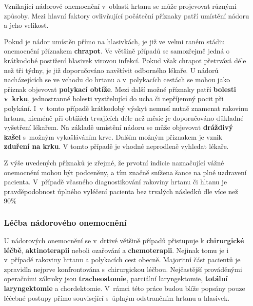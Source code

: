 Vznikající nádorové onemocnění v~oblasti hrtanu se může projevovat různými
způsoby. Mezi hlavní faktory ovlivňující počáteční příznaky patří umístění nádoru a
jeho velikost.

Pokud je nádor umístěn přímo na hlasivkách, je již ve velmi raném stádiu onemocnění příznakem \textbf{chrapot}.
Ve většině případů se samozřejmě jedná o krátkodobé postižení hlasivek virovou infekcí. Pokud však chrapot přetrvává déle než tři týdny, je již doporučováno navštívit odborného lékaře.
U nádorů nacházejících se ve vchodu do hrtanu a v~polykacích cestách se mohou
jako příznak objevovat \textbf{polykací obtíže}. Mezi další možné příznaky
patří \textbf{bolesti v~krku}, jednostranné bolesti vystřelující do ucha či
nepříjemný pocit při polykání. I~v~tomto případě krátkodobý výskyt nemusí
nutně znamenat rakovinu hrtanu, nicméně při obtížích trvajících déle než měsíc
je doporučováno důkladné  vyšetření lékařem.
Na základě umístění nádoru se může objevovat \textbf{dráždivý kašel} s~možným
vykašláváním krve. Dalším možným příznakem je vznik \textbf{zduření na krku}.
V tomto případě je vhodné neprodleně vyhledat lékaře.

Z výše uvedených příznaků je zřejmé, že prvotní indicie naznačující vážné onemocnění
mohou být podceněny, a tím značně snížena šance na plné uzdravení pacienta.
V~případě včasného diagnostikování rakoviny hrtanu či hltanu je pravděpodobnost
úplného vyléčení pacienta bez trvalých následků dle \cite{Slavicek2000} více než 90\%



\subsubsection{Léčba nádorového onemocnění} %
\label{chap:cause:desease:cancer:treatment}

U nádorových onemocnění se v~drtivé většině případů přistupuje k
\textbf{chirurgické léčbě}, \textbf{aktinoterapii} neboli ozařování a
\textbf{chemoterapii}. Nejinak tomu je i v~případě rakoviny hrtanu a
polykacích cest obecně. Majoritní část pacientů je zpravidla nejprve
konfrontována s~chirurgickou léčbou. Nejčastější prováděnými operačními zákroky jsou
\textbf{tracheostomie}, parciální laryngektomie, \textbf{totální
laryngektomie} a chordektomie. V~rámci této práce budou blíže popsány pouze
léčebné postupy přímo související s~úplným odstraněním hrtanu a hlasivek.

